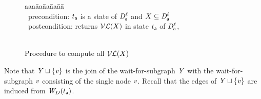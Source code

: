 \begin{figure}[H]
\setcounter{lctr}{0}
\begin{tabbing}\label{alg:compute-lfp}
aaa\= aa\= aa\= aa\= aa\=\kill
{}\\
\cmnt\ precondition: $t_\act$ is a state of $\dsk{\act}{\l}$ and $X \sub \dsk{\act}{\l}$\\
\cmnt\ postcondition: returns $\lVF{X}$ in state $t_\act$ of $\dsk{\act}{\l}$,\\
\\
\lio{\YS \gts \ewfg}

\lio{\FORALLC{\ndv \in \dsk{\act}{\l}}}




    \lih{\FI}
  \lit{\ENDFOR}
\lion{\RETURNE{\YS}}
\end{tabbing}
\caption{Procedure to compute all $\lVF{X}$}
\label{fig:algcomputeVL}
\end{figure}

Note that $\YS \join \set{\ndv}$ is the join of the wait-for-subgraph $\YS$ with the 
wait-for-subgraph $\ndv$ consisting of the single node $\ndv$. Recall
that the edges of $\YS \join \set{\ndv}$ are induced from $\lwfg{B}{t_\act}{\DS}$.
